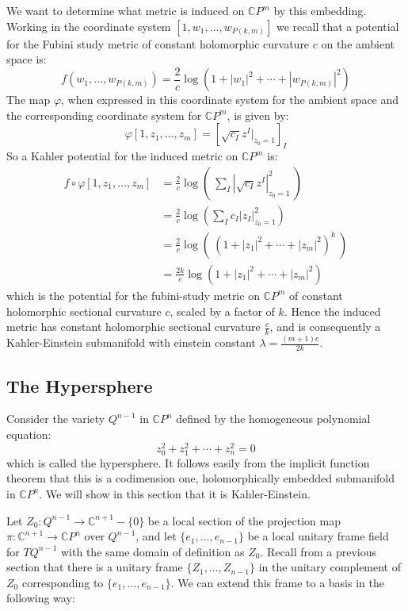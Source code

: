 \documentclass[11pt]{amsart}
\theoremstyle{definition}
\def \CP{ \mathbb{C}P }
\def \C{ \mathbb{C} }
\begin{document}
We want to determine what metric is induced on $\CP^m$ by this embedding.  Working in the coordinate system $[1, w_1, \ldots, w_{P(k,m)}]$ we recall that a potential for the Fubini study metric of constant holomorphic curvature $c$ on the ambient space is:
%
$$ f( w_1, \ldots, w_{P(k,m)} ) = \frac{2}{c} \log ( 1 + |w_1|^2 + \cdots + | w_{P(k,m)} |^2 ) $$
%
The map $\varphi$, when expressed in this coordinate system for the ambient space and the corresponding coordinate system for $\CP^m$, is given by:
%
$$ \varphi[ 1, z_1, \ldots, z_m ] = \left[ \sqrt{ c_I } z^I |_{z_0 = 1} \right]_I $$
%
So a Kahler potential for the induced metric on $\CP^m$ is:
%
\begin{align*}
f \circ \varphi[ 1, z_1, \ldots, z_m ] &= \frac{2}{c} \log \left( \ \sum_I | \sqrt{ c_I } z^I  |^2_{z_0 = 1} \ \right) \\
&= \frac{2}{c} \log \left( \sum_I c_I |z_I|^2_{z_0 = 1} \right) \\
&= \frac{2}{c} \log( \ ( 1 + |z_1|^2 + \cdots + |z_m|^2 )^k \ ) \\
&= \frac{2k}{c} \log( 1 + |z_1|^2 + \cdots + |z_m|^2 ) 
\end{align*}
%
which is the potential for the fubini-study metric on $\CP^m$ of constant holomorphic sectional curvature $c$, scaled by a factor of $k$.  Hence the induced metric has constant holomorphic sectional curvature $\frac{c}{k}$, and is consequently a Kahler-Einstein submanifold with einstein constant $\lambda = \frac{(m+1)c}{2k}$.

\subsection{ The Hypersphere }

Consider the variety $Q^{n-1}$ in $\CP^n$ defined by the homogeneous polynomial equation:
%
$$ z_0^2 + z_1^2 + \cdots + z_n^2 = 0 $$
%
which is called the hypersphere.  It follows easily from the implicit function theorem that this is a codimension one, holomorphically embedded submanifold in $\CP^n$.  We will show in this section that it is Kahler-Einstein.

Let $Z_0 : Q^{n-1} \rightarrow \C^{n+1} - \{0\}$ be a local section of the projection map $\pi: \C^{n+1} \rightarrow \CP^n$ over $Q^{n-1}$, and let $\{ e_1, \ldots, e_{n-1} \}$ be a local unitary frame field for $TQ^{n-1}$ with the same domain of definition as $Z_0$.  Recall from a previous section that there is a unitary frame $\{ Z_1, \ldots, Z_{n-1} \}$ in the unitary complement of $Z_0$ corresponding to $\{ e_1, \ldots, e_{n-1} \}$.  We can extend this frame to a basis in the following way:
\end{document}
